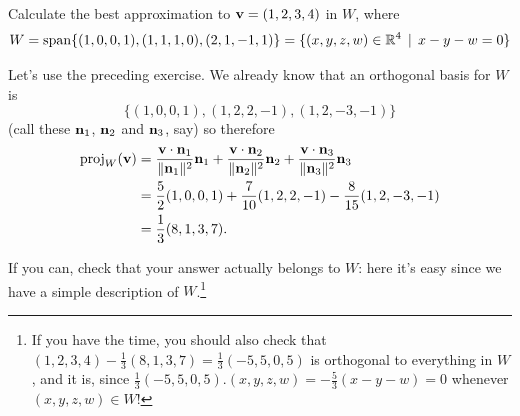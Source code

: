 \begin{myexample}\label{Wagain} Calculate the best approximation to  $\mathbf{v} = (1,2,3,4)$ in $W$, where
$$
W = \textrm{span}\{(1,0,0,1), (1,1,1,0), (2,1,-1,1)\}=\{(x,y,z,w)\in \mathbb{R}^4\,\mid \, x - y - w = 0 \}
$$

Let's use the preceding exercise.  We already know that an
orthogonal basis for $W$ is 
$$
\{  (1,0,0,1),  (1,2,2,-1),  (1,2,-3,-1)\}
$$
(call these $\mathbf{n}_1$, $\mathbf{n}_2$ and $\mathbf{n}_3$, say)
so therefore 
\begin{align*}
\operatorname{proj}_W(\mathbf{v}) &= \frac{\mathbf{v}\cdot\mathbf{n}_1}{\|\mathbf{n}_1\|^2} \mathbf{n}_1 +  \frac{\mathbf{v}\cdot\mathbf{n}_2}{\|\mathbf{n}_2\|^2} \mathbf{n}_2 + \frac{\mathbf{v}\cdot\mathbf{n}_3}{\|\mathbf{n}_3\|^2} \mathbf{n}_3 \\  
&= \frac{5}{2}  (1,0,0,1) + \frac{7}{10} (1,2,2,-1)  -\frac{8}{15}(1,2,-3,-1)\\
&=  \frac{1}{3}(8,1,3,7).
\end{align*}

If you can, check that your answer actually belongs to $W$: here it's easy since we have a simple description of $W$.\footnote{ If you have the time, you should also check that $(1,2,3,4)-\frac{1}{3}(8,1,3,7)=\frac13(-5,5,0,5)$ is orthogonal to everything in $W$, and it is, since $\frac13(-5,5,0,5).(x,y,z,w)=-\frac53 (x-y-w)=0 $ whenever $(x,y,z,w)\in W$! }
\end{myexample}


